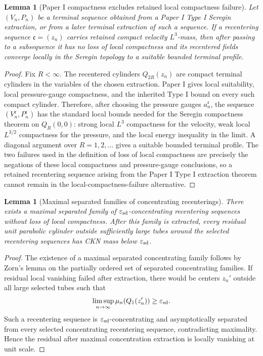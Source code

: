 \documentclass[11pt]{amsart}
\numberwithin{equation}{section}
\theoremstyle{plain}
\newtheorem{lemma}[theorem]{Lemma}
\theoremstyle{definition}
\theoremstyle{remark}
\newcommand{\eps}{\varepsilon}
\begin{document}
\begin{lemma}[Paper I compactness excludes retained local compactness failure]
\label{lem:rough-stratum-discharge}
Let \((V_n,P_n)\) be a terminal sequence obtained from a Paper I Type I
Seregin extraction, or from a later terminal extraction of such a sequence.
If a recentering sequence \(\mathfrak c=(z_n)\) carries retained compact
velocity \(L^3\)-mass, then
after passing to a subsequence it has no loss of local compactness and its
recentered fields
converge locally in the Seregin topology to a suitable bounded terminal
profile.
\end{lemma}

\begin{proof}
Fix \(R<\infty\).  The recentered cylinders \(Q_{2R}(z_n)\) are compact
terminal cylinders in the variables of the chosen extraction.  Paper I gives
local suitability, local pressure-gauge compactness, and the inherited Type I
bound on every such compact cylinder.  Therefore, after choosing the pressure
gauges \(a_n^{\mathfrak c}\), the sequence
\((V_n^{\mathfrak c},P_n^{\mathfrak c})\) has the standard local bounds needed
for the Seregin compactness theorem on \(Q_R(0,0)\): strong local \(L^3\)
compactness for the velocity, weak local \(L^{3/2}\) compactness for the
pressure, and the local energy inequality in the limit.  A diagonal argument
over \(R=1,2,\dots\) gives a suitable bounded terminal profile.  The two
failures used in the definition of loss of local compactness are precisely the
negations of these local compactness and pressure-gauge conclusions, so a
retained recentering sequence arising from the Paper I Type I extraction theorem
cannot remain in the local-compactness-failure alternative.
\end{proof}

\begin{lemma}[Maximal separated families of concentrating recenterings]
\label{lem:maximal-active-family}
There exists a maximal separated family of \(\eps_{\rm sd}\)-concentrating
recentering sequences without loss of local compactness.  After this family is
extracted, every residual unit parabolic cylinder outside sufficiently large
tubes around the selected recentering sequences has CKN mass below
\(\eps_{\rm sd}\).
\end{lemma}

\begin{proof}
The existence of a maximal separated concentrating family follows by Zorn's
lemma on the partially ordered set of separated concentrating families.  If residual local
vanishing failed after extraction, there would be centers \(z_n'\) outside all
large selected tubes such that
\[
   \limsup_{n\to\infty}\mu_n(Q_1(z_n'))\ge\eps_{\rm sd}.
\]
Such a recentering sequence is \(\eps_{\rm sd}\)-concentrating and
asymptotically separated from every selected concentrating recentering sequence,
contradicting maximality.  Hence the residual after maximal concentration
extraction is locally vanishing at unit scale.
\end{proof}
\end{document}

